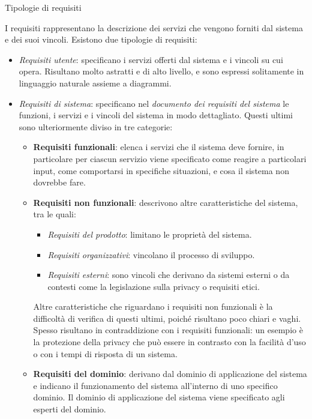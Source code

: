 \begin{problem}{2.4}
Tipologie di requisiti
\end{problem}
\begin{solution}
I requisiti rappresentano la descrizione dei servizi che vengono forniti dal sistema e dei suoi vincoli.
\newline
Esistono due tipologie di requisiti:
\begin{itemize}
	\item \textit{Requisiti utente}: specificano i servizi offerti dal sistema e i vincoli su cui opera. Risultano molto astratti e di alto livello, e sono espressi solitamente in linguaggio naturale assieme a diagrammi.
	\item \textit{Requisiti di sistema}: specificano nel \textit{documento dei requisiti del sistema} le funzioni, i servizi e i vincoli del sistema in modo dettagliato.
	\newline
	Questi ultimi sono ulteriormente diviso in tre categorie:
	\begin{itemize}
		\item \textbf{Requisiti funzionali}: elenca i servizi che il sistema deve fornire, in particolare per ciascun servizio viene specificato come reagire a particolari input, come comportarsi in specifiche situazioni, e cosa il sistema non dovrebbe fare.
		\item \textbf{Requisiti non funzionali}: descrivono altre caratteristiche del sistema, tra le quali:
		\begin{itemize}
			\item \textit{Requisiti del prodotto}: limitano le proprietà del sistema.
			\item \textit{Requisiti organizzativi}: vincolano il processo di sviluppo.
			\item \textit{Requisiti esterni}: sono vincoli che derivano da sistemi esterni o da contesti come la legislazione sulla privacy o requisiti etici.
		\end{itemize}
		Altre caratteristiche che riguardano i requisiti non funzionali è la difficoltà di verifica di questi ultimi, poiché risultano poco chiari e vaghi.
		Spesso risultano in contraddizione con i requisiti funzionali: un esempio è la protezione della privacy che può essere in contrasto con la facilità d'uso o con i tempi di risposta di un sistema.
		\item \textbf{Requisiti del dominio}: derivano dal dominio di applicazione del sistema e indicano il funzionamento del sistema all'interno di uno specifico dominio.
		\newline
		Il dominio di applicazione del sistema viene specificato agli esperti del dominio.
	\end{itemize}
\end{itemize}
\end{solution}

